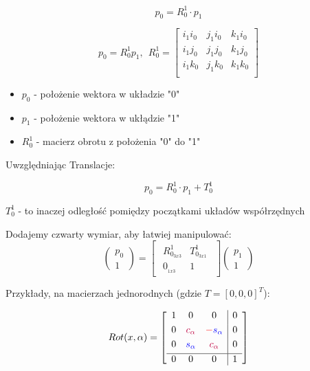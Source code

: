 \documentclass{article}
\begin{document}
\Large
$$
    p_{0} = R_{0}^{1} \cdot p_{1}
$$

$$
    p_0 = R_0^1 p_1
    , \ \
    R_0^1 =
    \left[ \begin{array}{ccc}
            i_1 i_0 & j_1 i_0 & k_1 i_0 \\
            i_1 j_0 & j_1 j_0 & k_1 j_0 \\
            i_1 k_0 & j_1 k_0 & k_1 k_0 \\
        \end{array} \right]
$$

\normalsize

\begin{itemize}
    \item $p_{0}$ - położenie wektora w układzie "0"
    \item $p_{1}$ - położenie wektora w ukłądzie "1"
    \item $R_{0}^{1}$ - macierz obrotu z położenia "0" do "1"
\end{itemize}

Uwzględniając Translacje:

\Large
$$
    p_{0} = R_{0}^{1} \cdot p_{1} + T_{0}^{1}
$$
\normalsize

$T_{0}^{1}$ - to inaczej odległość pomiędzy początkami układów współrzędnych

Dodajemy czwarty wymiar, aby łatwiej manipulować:
\Large
$$
    \begin{pmatrix}
        p_{0} \\
        1
    \end{pmatrix}
    =
    \begin{bmatrix}
        \begin{array}{c|c}
            R_{0_{3x3}}^{1} & T_{0_{3x1}}^{1} \\[0.3em]
            \hline
            0_{_{1x3}}      & 1
        \end{array}
    \end{bmatrix}
    \begin{pmatrix}
        p_{1} \\
        1
    \end{pmatrix}
$$
\normalsize

\newpage

Przykłady, na macierzach jednorodnych (gdzie $T = \left[0, 0, 0\right]^{T}$):



\Large
$$
    Rot(x, \alpha) =
    \begin{bmatrix}
        \begin{array}{ccc|c}
            1 & 0                           & 0                                       & 0 \\[0.3em]
            0 & {\color{purple} c_{\alpha}} & {\color{red}-}{\color{blue} s_{\alpha}} & 0 \\[0.3em]
            0 & {\color{blue} s_{\alpha}}   & {\color{purple} c_{\alpha}}             & 0 \\[0.3em]
            \hline
            0 & 0                           & 0                                       & 1
        \end{array}
    \end{bmatrix}
$$
\normalsize
\end{document}
